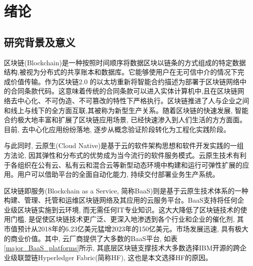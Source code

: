 \chapter{绪论}

\section{研究背景及意义}

区块链(Blockchain)是一种按照时间顺序将数据区块以链条的方式组成的特定数据结构,被视为分布式的共享账本和数据库。它能够使用户在无可信中介的情况下完成价值传输\cite{SurveyofEnterpriseBlockchains}。作为区块链2.0 的以太坊\footnotemark[1]重新将智能合约描述为部署于区块链网络中的合同条款代码。这意味着传统的合同条款可以进入实体计算机中,且在区块链网络去中心化、不可伪造、不可篡改的特性下严格执行。区块链推进了人与企业之间和线上与线下的全方面互联,其被称为新型生产关系。随着区块链的快速发展, 智能合约极大地丰富和扩展了区块链应用场景, 已经快速渗入到人们生活的方方面面。目前, 去中心化应用纷纷落地, 逐步从概念验证阶段转化为工程化实践阶段\footnotemark[2]。

与此同时, 云原生(Cloud Native)是基于云的软件架构思想和软件开发实践的一组方法论, 因其弹性和分布式的优势成为当今流行的软件服务模式。云原生技术有利于各组织在公有云、私有云和混合云等新型动态环境中构建和运行可弹性扩展的应用。用户可以借助平台的全面自动化能力, 持续交付部署业务生产系统。

区块链即服务(Blockchain as a Service, 简称BaaS)则是基于云原生技术体系的一种构建、管理、托管和运维区块链网络及其应用的云服务平台\cite{onik2019performance}。BaaS支持将任何企业级区块链实施到云环境, 而无需任何IT专业知识。这大大降低了区块链技术的使用门槛, 是促使区块链技术更广泛、更深入地渗透到各个行业和企业的催化剂, 其市值预计从2018年的6.23亿美元猛增2023年的150亿美元\footnotemark[3]。市场发展迅速, 具有极大的商业价值。其中, 云厂商提供了大多数的BaaS平台\cite{KuernetesbasedFabricChaincodeManagementAndHihgAvailabilityTechnology}, 如表\ref{major_BaaS_platforms}所示, 其底层区块链支撑技术大多数选择IBM开源的跨企业级联盟链Hyperledger Fabric(简称HF), 这也是本文选择HF的原因。

